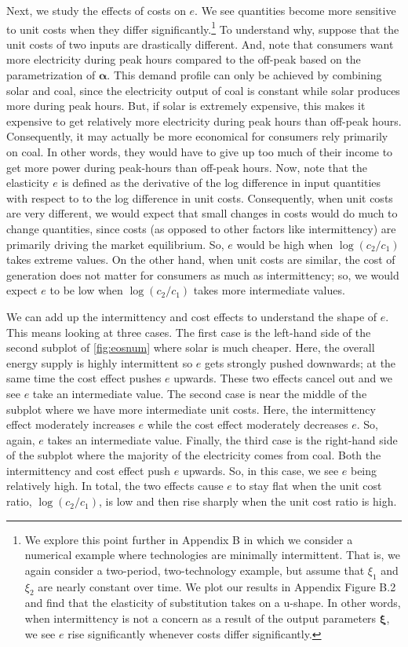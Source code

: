 \documentclass[11pt,a4paper,leqno]{extarticle}
\begin{document}
	Next, we study the effects of costs on $e$. We see quantities become more sensitive to unit costs when they differ significantly.\footnote{We explore this point further in Appendix B in which we consider a numerical example where technologies are minimally intermittent. That is, we again consider a two-period, two-technology example, but assume that $\xi_1$ and $\xi_2$ are nearly constant over time. We plot our results in Appendix Figure B.2 and find that the elasticity of substitution takes on a u-shape. In other words, when intermittency is not a concern as a result of the output parameters $\boldsymbol{\xi}$, we see $e$ rise significantly whenever costs differ significantly. 
	} To understand why, suppose that the unit costs of two inputs are drastically different. And, note that consumers want more electricity during peak hours compared to the off-peak based on the parametrization of $\boldsymbol{\alpha}$. This demand profile can only be achieved by combining solar and coal, since the electricity output of coal is constant while solar produces more during peak hours. But, if solar is extremely expensive, this makes it expensive to get relatively more electricity during peak hours than off-peak hours.  Consequently, it may actually be more economical for consumers rely primarily on coal. In other words, they would have to give up too much of their income to get more power during peak-hours than off-peak hours.  Now, note that the elasticity $e$ is defined as the derivative of the log difference in input quantities with respect to to the log difference in unit costs. Consequently, when unit costs are very different, we would expect that small changes in costs would do much to change quantities, since costs (as opposed to other factors like intermittency) are primarily driving the market equilibrium. So, $e$ would be high when $\log(c_2/c_1)$ takes extreme values. On the other hand, when unit costs are similar, the cost of generation does not matter for consumers as much as intermittency; so, we would expect $e$ to be low when $\log(c_2/c_1)$ takes more intermediate values. 
	
	We can add up the intermittency and cost effects to understand the shape of $e$. This means looking at three cases. The first case is the left-hand side of the second subplot of \autoref{fig:eosnum} where solar is much cheaper. Here, the overall energy supply is highly intermittent so $e$ gets strongly pushed downwards; at the same time the cost effect pushes $e$ upwards. These two effects cancel out and we see $e$ take an intermediate value. The second case is near the middle of the subplot where we have more intermediate unit costs. Here, the intermittency effect moderately increases $e$ while the cost effect moderately decreases $e$. So, again, $e$ takes an intermediate value. Finally, the third case is the right-hand side of the subplot where the majority of the electricity comes from coal. Both the intermittency and cost effect push $e$ upwards. So, in this case, we see $e$ being relatively high. In total, the two effects cause $e$ to stay flat when the unit cost ratio, $\log(c_2/c_1)$, is low and then rise sharply when the unit cost ratio is high. 
	
\end{document}
